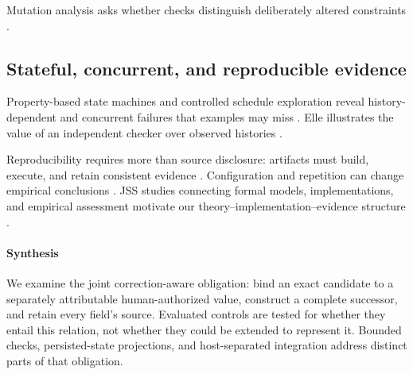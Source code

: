 Mutation analysis asks whether checks distinguish deliberately altered constraints \citep{sullivan2017alloymutation,jia2011mutation,just2014mutants}.

\subsection{Stateful, concurrent, and reproducible evidence}

Property-based state machines and controlled schedule exploration reveal history-dependent and concurrent failures that examples may miss \citep{claessen2000quickcheck,claessen2009pulse,musuvathi2008chess}. Elle illustrates the value of an independent checker over observed histories \citep{kingsbury2020elle}.

Reproducibility requires more than source disclosure: artifacts must build, execute, and retain consistent evidence \citep{collberg2016repeatability,hermann2020artifacts,kessel2024openscience,liu2024artifacts}. Configuration and repetition can change empirical conclusions \citep{klees2018fuzz}. JSS studies connecting formal models, implementations, and empirical assessment motivate our theory--implementation--evidence structure \citep{stachtiari2018correctness,alam2021dbverify,song2023continuous,coppa2024concolic}.

\paragraph{Synthesis}
We examine the joint correction-aware obligation: bind an exact candidate to a separately attributable human-authorized value, construct a complete successor, and retain every field's source. Evaluated controls are tested for whether they entail this relation, not whether they could be extended to represent it. Bounded checks, persisted-state projections, and host-separated integration address distinct parts of that obligation.

